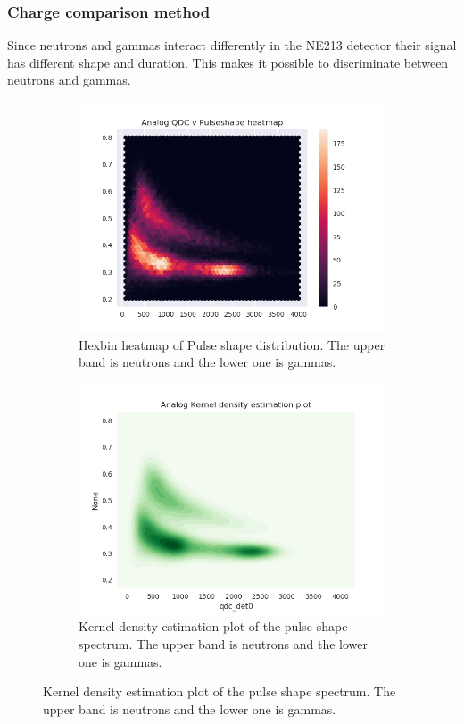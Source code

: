 \documentclass[main.tex]{subfiles}
\begin{document}
\subsubsection{Charge comparison method}
Since neutrons and gammas interact differently in the NE213 detector their signal has different shape and duration. This makes it possible to discriminate between neutrons and gammas.



\begin{figure}
    \centering
    \begin{subfigure}[b]{0.9\textwidth}
        \includegraphics[width=\textwidth]{AnalogResults/psd_hexbin.png}
        \caption{Hexbin heatmap of Pulse shape distribution. The upper band is neutrons and the lower one is gammas.}
        \label{fig:hex_a}
    \end{subfigure}
    \begin{subfigure}[b]{0.9\textwidth}
        \includegraphics[width=\textwidth]{AnalogResults/psd_kde.png}
        \caption{Kernel density estimation plot of the pulse shape spectrum. The upper band is neutrons and the lower one is gammas.}
        \label{fig:kde_a}
    \end{subfigure}
\label{fig:animals}
\end{figure}
\end{document}
